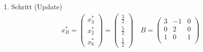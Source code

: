 \documentclass[a4paper]{scrartcl}
\begin{document}
\begin{enumerate}[label=\bfseries\arabic*.]
\begin{enumerate}
\begin{enumerate}[1.]
\begin{enumerate}[1.]
                            \item Schritt (Update)
                                \begin{gather}
                                    x_B^* =
                                    \begin{pmatrix}
                                         x_3^* \\ x_2^* \\ x_6^*
                                    \end{pmatrix}
                                    =
                                    \begin{pmatrix}
                                        \frac{3}{2} \\ \frac{5}{2} \\ \frac{1}{2}
                                    \end{pmatrix}
                                    \quad
                                    B =
                                    \begin{pmatrix}
                                        3 & -1 & 0 \\
                                        0 &  2 & 0 \\
                                        1 &  0 & 1 \\
                                    \end{pmatrix}
                                \end{gather}

                        \end{enumerate}


\end{enumerate}
\end{enumerate}
\end{enumerate}
\end{document}
